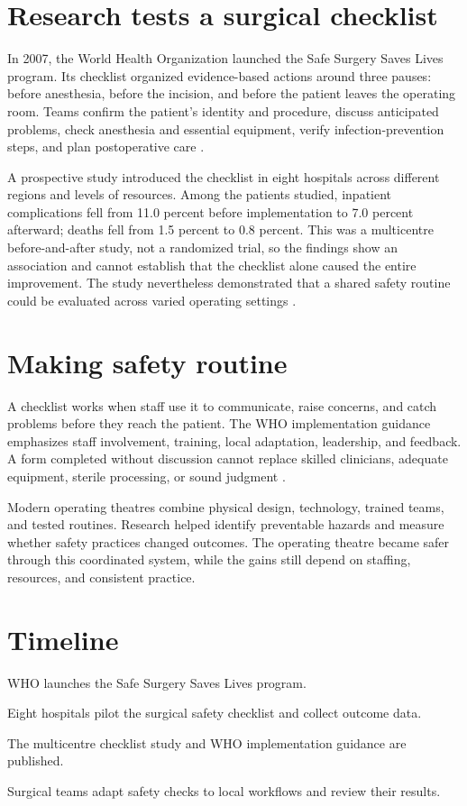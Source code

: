 \documentclass[12pt,oneside]{book}
\begin{document}
\section{Research tests a surgical checklist}
In 2007, the World Health Organization launched the Safe Surgery Saves Lives
program. Its checklist organized evidence-based actions around three pauses:
before anesthesia, before the incision, and before the patient leaves the
operating room. Teams confirm the patient's identity and procedure, discuss
anticipated problems, check anesthesia and essential equipment, verify
infection-prevention steps, and plan postoperative care
\cite{whoSafeSurgery2009,whoSurgicalChecklistManual2009}.

A prospective study introduced the checklist in eight hospitals across
different regions and levels of resources. Among the patients studied,
inpatient complications fell from 11.0 percent before implementation to 7.0
percent afterward; deaths fell from 1.5 percent to 0.8 percent. This was a
multicentre before-and-after study, not a randomized trial, so the findings
show an association and cannot establish that the checklist alone caused the
entire improvement. The study nevertheless demonstrated that a shared safety
routine could be evaluated across varied operating settings
\cite{haynesSurgicalChecklist2009}.

\section{Making safety routine}
A checklist works when staff use it to communicate, raise concerns, and catch
problems before they reach the patient. The WHO implementation guidance
emphasizes staff involvement, training, local adaptation, leadership, and
feedback. A form completed without discussion cannot replace skilled
clinicians, adequate equipment, sterile processing, or sound judgment
\cite{whoSurgicalChecklistManual2009}.

Modern operating theatres combine physical design, technology, trained teams,
and tested routines. Research helped identify preventable hazards and measure
whether safety practices changed outcomes. The operating theatre became safer
through this coordinated system, while the gains still depend on staffing,
resources, and consistent practice.

\section*{Timeline}
\begin{description}[leftmargin=2.3cm,style=nextline]
  \item[2007] WHO launches the Safe Surgery Saves Lives program.
  \item[2008] Eight hospitals pilot the surgical safety checklist and collect outcome data.
  \item[2009] The multicentre checklist study and WHO implementation guidance are published.
  \item[Today] Surgical teams adapt safety checks to local workflows and review their results.
\end{description}
\end{document}
